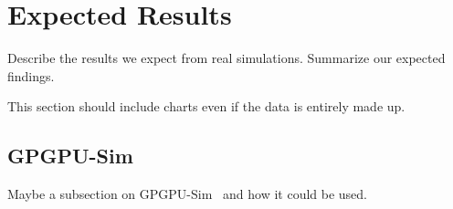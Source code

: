 \section{Expected Results}

Describe the results we expect from real simulations. Summarize our
expected findings.

This section should include charts even if the data is entirely made
up. 

\subsection{GPGPU-Sim}
Maybe a subsection on GPGPU-Sim~\cite{bakhodayuan09} and how it could be used.
